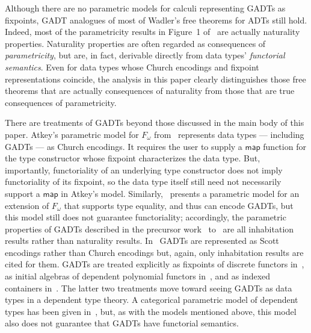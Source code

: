 \documentclass[submission,copyright,creativecommons]{eptcs}
\begin{document}
Although there are no parametric models for calculi representing GADTs
as fixpoints, GADT analogues of most of Wadler's free theorems for
ADTs still hold.
Indeed, most of the parametricity results in Figure~1 of~\cite{wad89}
are actually naturality properties.
Naturality properties are often regarded as consequences of {\em
  parametricity}, but are, in fact, derivable directly from data
types' {\em functorial semantics}. Even for data types whose Church
encodings and fixpoint representations coincide, the analysis in this
paper clearly distinguishes those free theorems that are actually
consequences of naturality from those that are true consequences of
parametricity.


There are treatments of GADTs beyond those discussed in the main body
of this paper.  Atkey's parametric model for $F_\omega$
from~\cite{atk12} represents data types --- including GADTs --- as
Church encodings. It requires the user to supply a $\mathsf{map}$
function for the type constructor whose fixpoint characterizes the
data type. But, importantly, functoriality of an underlying type
constructor does not imply functoriality of its fixpoint, so the data
type itself still need not necessarily support a $\mathsf{map}$ in
Atkey's model. Similarly,~\cite{vw10} presents a parametric model for
an extension of $F_\omega$ that supports type equality, and thus can
encode GADTs, but this model still does not guarantee functoriality;
accordingly, the parametric properties of GADTs described in the
precursor work~\cite{vw06} to~\cite{vw10} are all inhabitation results
rather than naturality results. In~\cite{ms09} GADTs are represented
as Scott encodings rather than Church encodings but, again, only
inhabitation results are cited for them. GADTs are treated explicitly
as fixpoints of discrete functors in~\cite{jg08}, as initial algebras
of dependent polynomial functors in~\cite{gh03,hf11}, and as indexed
containers in~\cite{ma09}. The latter two treatments move toward
seeing GADTs as data types in a dependent type theory. A categorical
parametric model of dependent types has been given in~\cite{agj14},
but, as with the models mentioned above, this model also does not
guarantee that GADTs have functorial semantics.



\end{document}
